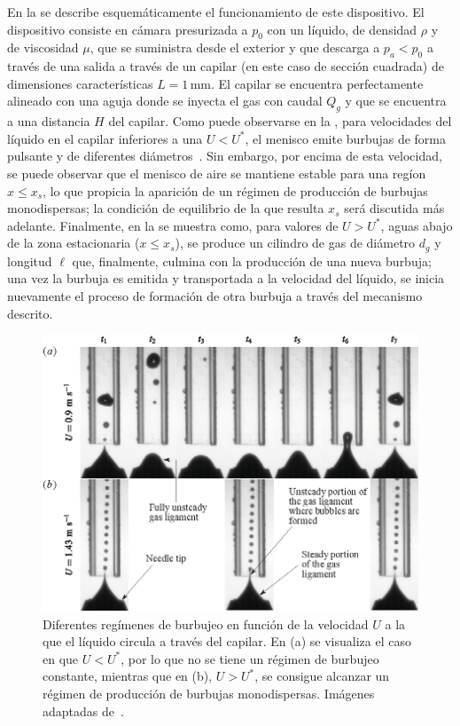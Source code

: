  En la  se describe esquemáticamente el funcionamiento de este dispositivo. El dispositivo consiste en cámara presurizada a $p_{0}$ con un líquido, de densidad $\rho$ y de viscosidad $\mu$, que se suministra desde el exterior y que descarga a $p_{a} < p_{0}$ a través de una salida a través de un capilar (en este caso de sección cuadrada) de dimensiones características $L = 1\,\mathrm{mm}$. El capilar se encuentra perfectamente alineado con una aguja donde se inyecta el gas con caudal $Q_{g}$ y que se encuentra a una distancia $H$ del capilar. Como puede observarse en la , para velocidades del líquido en el capilar inferiores a una $U < U^{*}$, el menisco emite burbujas de forma pulsante y de diferentes diámetros~\cite{Evangelio2015b}. Sin embargo, por encima de esta velocidad, se puede observar que el menisco de aire se mantiene estable para una regíon $x \leq x_{s}$, lo que propicia la aparición de un régimen de producción de burbujas monodispersas; la condición de equilibrio de la que resulta $x_{s}$ será discutida más adelante. Finalmente, en la  se muestra como, para valores de $U > U^{*}$, aguas abajo de la zona estacionaria ($x \leq x_{s}$), se produce un cilindro de gas de diámetro $d_{g}$ y longitud $\ell$ que, finalmente, culmina con la producción de una nueva burbuja; una vez la burbuja es emitida y transportada a la velocidad del líquido, se inicia nuevamente el proceso de formación de otra burbuja a través del mecanismo descrito. 
 
\begin{figure}[hbtp!]
\includegraphics[scale=1]{introduccion/figuras/fenomenologia.eps}
\caption{Diferentes regímenes de burbujeo en función de la velocidad $U$ a la que el líquido circula a través del capilar. En (a) se visualiza el caso en que $U < U^{*}$, por lo que no se tiene un régimen de burbujeo constante, mientras que en (b), $U > U^{*}$, se consigue alcanzar un régimen de producción de burbujas monodispersas. Imágenes adaptadas de~\cite{Evangelio2015b}.}
\end{figure}

